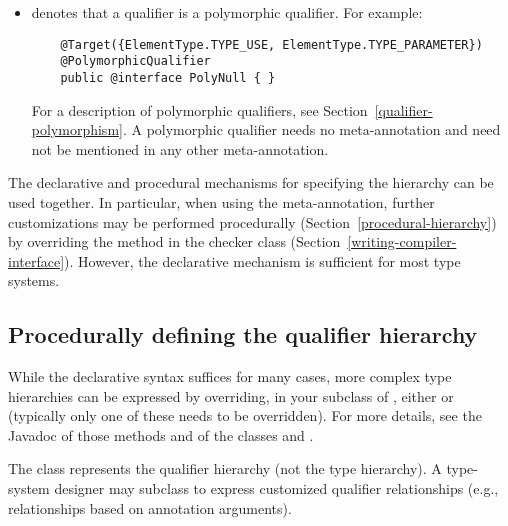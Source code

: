 \begin{itemize}
\item {} denotes that a qualifier is a
  polymorphic qualifier.  For example:

  \begin{Verbatim}
    @Target({ElementType.TYPE_USE, ElementType.TYPE_PARAMETER})
    @PolymorphicQualifier
    public @interface PolyNull { }
  \end{Verbatim}

  For a description of polymorphic qualifiers, see
  Section~\ref{qualifier-polymorphism}.  A polymorphic qualifier needs
  no  meta-annotation and need not be
  mentioned in any other 
  meta-annotation.

\end{itemize}

The declarative and procedural mechanisms for specifying the hierarchy can
be used together.  In particular, when using the 
meta-annotation, further customizations may be
performed procedurally (Section~\ref{procedural-hierarchy})
by overriding the  method in the checker class
(Section~\ref{writing-compiler-interface}).
However, the declarative mechanism is sufficient for most type systems.


\subsection{Procedurally defining the qualifier hierarchy\label{procedural-hierarchy}}

While the declarative syntax suffices for many cases, more complex
type hierarchies can be expressed by overriding, in your subclass of ,
either  or  (typically
only one of these needs to be overridden).
For more details, see the Javadoc of those methods and of the classes
 and .

The  class represents the qualifier hierarchy (not the
type hierarchy).  A type-system designer may subclass
 to express customized qualifier
relationships (e.g., relationships based on annotation
arguments).

